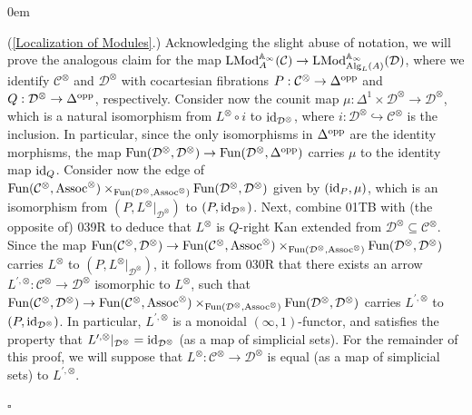 \documentclass[10pt]{article}
\newcommand{\C}{\mathcal C}
\newcommand{\cD}{\mathcal{D}}
\renewcommand{\qed}{\hfill$\square$}
\renewenvironment{proof}{\begin{addmargin}[1em]{0em}\begin{newproof}}{\end{newproof}\end{addmargin}\qed}
\theoremstyle{witharg}
\theoremstyle{witharg}
\theoremstyle{witharg2}
\begin{document}
\begin{proof}(\ref{Localization of Modules}.) Acknowledging the slight abuse of notation, we will prove the analogous claim for the map $\textnormal{LMod}^{\mathbb{A}_\infty}_A(\C)\rightarrow \textnormal{LMod}^{\mathbb{A}_\infty}_{\textnormal{Alg}_{L}(A)}(\cD)$, where we identify $\C^\otimes$ and $\cD^\otimes$ with cocartesian fibrations $P:\C^\otimes\rightarrow \Delta^{\textnormal{opp}}$ and $Q:\cD^\otimes\rightarrow \Delta^{\textnormal{opp}}$, respectively. Consider now the counit map $\mu:\Delta^1\times \cD^\otimes\rightarrow \cD^\otimes$, which is a natural isomorphism from $L^\otimes\circ i$ to $\textnormal{id}_{\cD^\otimes}$, where $i:\cD^\otimes\hookrightarrow \C^\otimes$ is the inclusion. In particular, since the only isomorphisms in $\Delta^{\textnormal{opp}}$ are the identity morphisms, the map $\textnormal{Fun}(\cD^\otimes,\cD^\otimes)\rightarrow \textnormal{Fun}(\cD^\otimes,\Delta^{\textnormal{opp}})$ carries $\mu$ to the identity map $\textnormal{id}_Q$. Consider now the edge of $\textnormal{Fun}(\C^\otimes,\textnormal{Assoc}^\otimes)\times_{\textnormal{Fun}(\cD^\otimes,\textnormal{Assoc}^\otimes)}\textnormal{Fun}(\cD^\otimes,\cD^\otimes)$ given by $(\textnormal{id}_P,\mu)$, which is an isomorphism from $(P,L^\otimes|_{\cD^\otimes})$ to $(P,\textnormal{id}_{\cD^\otimes})$. Next, combine  01TB with (the opposite of)  039R to deduce that $L^\otimes$ is $Q$-right Kan extended from $\cD^\otimes\subseteq \C^\otimes$. Since the map $\textnormal{Fun}(\C^\otimes,\cD^\otimes)\rightarrow \textnormal{Fun}(\C^\otimes,\textnormal{Assoc}^\otimes)\times_{\textnormal{Fun}(\cD^\otimes,\textnormal{Assoc}^\otimes)}\textnormal{Fun}(\cD^\otimes,\cD^\otimes)$ carries $L^\otimes$ to $(P,L^\otimes|_{\cD^\otimes})$, it follows from  030R that there exists an arrow $L^{\prime,\otimes}:\C^\otimes\rightarrow \cD^\otimes$ isomorphic to $L^\otimes$, such that $\textnormal{Fun}(\C^\otimes,\cD^\otimes)\rightarrow \textnormal{Fun}(\C^\otimes,\textnormal{Assoc}^\otimes)\times_{\textnormal{Fun}(\cD^\otimes,\textnormal{Assoc}^\otimes)}\textnormal{Fun}(\cD^\otimes,\cD^\otimes)$ carries $L^{\prime,\otimes}$ to $(P,\textnormal{id}_{\cD^\otimes})$. In particular, $L^{\prime,\otimes}$ is a monoidal $(\infty,1)$-functor, and satisfies the property that $L^{\prime,\otimes}|_{\cD^\otimes}=\textnormal{id}_{\cD^\otimes}$ (as a map of simplicial sets). For the remainder of this proof, we will suppose that $L^\otimes:\C^\otimes\rightarrow \cD^\otimes$ is equal (as a map of simplicial sets) to $L^{\prime,\otimes}$.


\end{proof}
\end{document}
